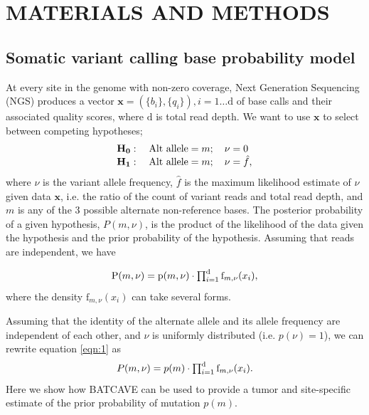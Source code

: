 \documentclass[a4,center,fleqn]{NAR}
\newcommand{\batcave}{BATCAVE }
\begin{document}
\section{MATERIALS AND METHODS}
\subsection{Somatic variant calling base probability model}

At every site in the genome with non-zero coverage, Next Generation Sequencing (NGS) produces a vector $\mathbf{x}  = (\{b_i\},\{q_i\}), i = 1\dots \mathrm{d}$ of base calls and their associated quality scores, where $\mathrm{d}$ is total read depth.
We want to use $\mathbf{x}$ to select between competing hypotheses;
\begin{equation}
  \label{eqn:hypothesis}
$$
  \begin{array}{l}
    \mathbf{H_0}:\quad \textrm{Alt allele} = m;\quad\nu = 0\\
    \mathbf{H_1}:\quad \textrm{Alt allele} = m;\quad\nu = \hat{f},
  \end{array}
$$
\end{equation}
where $\nu$ is the variant allele frequency, $\hat{f}$ is the maximum likelihood estimate of $\nu$ given data $\mathbf{x}$, i.e. the ratio of the count of variant reads and total read depth, and $m$ is any of the 3 possible alternate non-reference bases.
The posterior probability of a given hypothesis, $P(m,\nu)$, is the product of the likelihood of the data given the hypothesis and the prior probability of the hypothesis. 
Assuming that reads are independent, we have

\begin{equation}
  \label{eqn:1}
$$
  \mathrm{P}(m,\nu) = \mathrm{p}(m,\nu) \cdot \prod_{i=1}^{\mathrm{d}} \textrm{f}_{m,\nu}(x_i),
$$
\end{equation}
where the density $\textrm{f}_{m,\nu}(x_i)$ can take several forms.

Assuming that the identity of the alternate allele and its allele frequency are independent of each other, and $\nu$ is uniformly distributed (i.e. $p(\nu) = 1$), we can rewrite equation \ref{eqn:1} as
\begin{equation}
  \label{eqn:2}
$$
  P(m,\nu) = p(m) \cdot \prod_{i=1}^{\mathrm{d}} \textrm{f}_{m,\nu}(x_i).
$$
\end{equation}
Here we show how \batcave can be used to provide a tumor and site-specific estimate of the prior probability of mutation $p(m)$.
\end{document}

